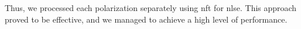 Thus, we processed each polarization separately using \acrshort{nft} for \acrshort{nlse}. This approach proved to be effective, and we managed to achieve a high level of performance.


\begin{figure}[tpb]
    \begin{minipage}[h]{0.5\linewidth}
    \end{minipage}
    \hfill
    \begin{minipage}[h]{0.5\linewidth}
\end{minipage}
\end{figure}
